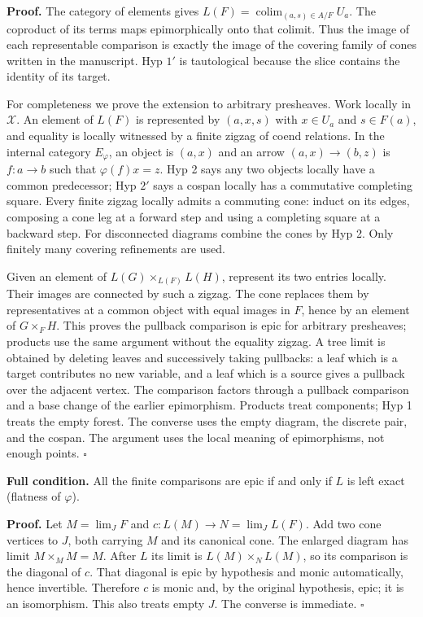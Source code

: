 \textbf{Proof.} The category of elements gives
\(L(F)=\operatorname{colim}_{(a,s)\in A/F}U_a\). The coproduct of its
terms maps epimorphically onto that colimit. Thus the image of each
representable comparison is exactly the image of the covering family of
cones written in the manuscript. Hyp \(1'\) is tautological because the
slice contains the identity of its target.

For completeness we prove the extension to arbitrary presheaves. Work
locally in \(\mathcal X\). An element of \(L(F)\) is represented by
\((a,x,s)\) with \(x\in U_a\) and \(s\in F(a)\), and equality is locally
witnessed by a finite zigzag of coend relations. In the internal
category \(E_\varphi\), an object is \((a,x)\) and an arrow
\((a,x)\to(b,z)\) is \(f:a\to b\) such that \(\varphi(f)x=z\). Hyp 2
says any two objects locally have a common predecessor; Hyp \(2'\) says
a cospan locally has a commutative completing square. Every finite
zigzag locally admits a commuting cone: induct on its edges, composing a
cone leg at a forward step and using a completing square at a backward
step. For disconnected diagrams combine the cones by Hyp 2. Only
finitely many covering refinements are used.

Given an element of \(L(G)\times_{L(F)}L(H)\), represent its two entries
locally. Their images are connected by such a zigzag. The cone replaces
them by representatives at a common object with equal images in \(F\),
hence by an element of \(G\times_FH\). This proves the pullback
comparison is epic for arbitrary presheaves; products use the same
argument without the equality zigzag. A tree limit is obtained by
deleting leaves and successively taking pullbacks: a leaf which is a
target contributes no new variable, and a leaf which is a source gives a
pullback over the adjacent vertex. The comparison factors through a
pullback comparison and a base change of the earlier epimorphism.
Products treat components; Hyp 1 treats the empty forest. The converse
uses the empty diagram, the discrete pair, and the cospan. The argument
uses the local meaning of epimorphisms, not enough points. \(\square\)

\textbf{Full condition.} All the finite comparisons are epic if and only
if \(L\) is left exact (flatness of \(\varphi\)).

\textbf{Proof.} Let \(M=\lim_JF\) and \(c:L(M)\to N=\lim_JL(F)\). Add
two cone vertices to \(J\), both carrying \(M\) and its canonical cone.
The enlarged diagram has limit \(M\times_M M=M\). After \(L\) its limit
is \(L(M)\times_NL(M)\), so its comparison is the diagonal of \(c\).
That diagonal is epic by hypothesis and monic automatically, hence
invertible. Therefore \(c\) is monic and, by the original hypothesis,
epic; it is an isomorphism. This also treats empty \(J\). The converse
is immediate. \(\square\)

